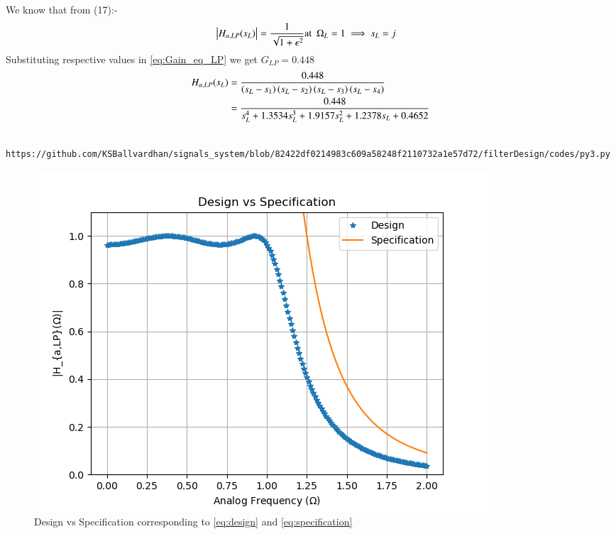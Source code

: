 \documentclass{article}
\begin{document}
\begin{enumerate}
		We know that from (17):-
		\begin{align}
			\left\vert H_{a,LP}(s_L)\right\vert &= \frac{1}{\sqrt{1+\epsilon^2}} \text{at} \hspace{5pt} \Omega_{L}=1 \implies s_{L} = j \label{eq:Gain_eq_LP} 
		\end{align}
		Substituting respective values in \eqref{eq:Gain_eq_LP} we get $G_{LP}=0.448$
		\begin{align}
			H_{a,LP}(s_L) &= \frac{0.448}{\left(s_L-s_1\right)\left(s_L-s_2\right)\left(s_L-s_3\right)\left(s_L-s_4\right)}\\
			&= \frac{0.448}{s_{L}^4 + 1.3534s_L^3 + 1.9157s_L^2 + 1.2378s_L + 0.4652}\label{eq:design}
		\end{align}
		\begin{lstlisting}
			https://github.com/KSBallvardhan/signals_system/blob/82422df0214983c609a58248f2110732a1e57d72/filterDesign/codes/py3.py
		\end{lstlisting}
		\begin{figure}[htbp]
			\centering
			\includegraphics[width=1\linewidth]{figs/fig3}
			\caption{Design vs Specification corresponding to \eqref{eq:design} and \eqref{eq:specification}}
			\label{fig:design_vs_specf}
		\end{figure}
		

\end{enumerate}
\end{document}
